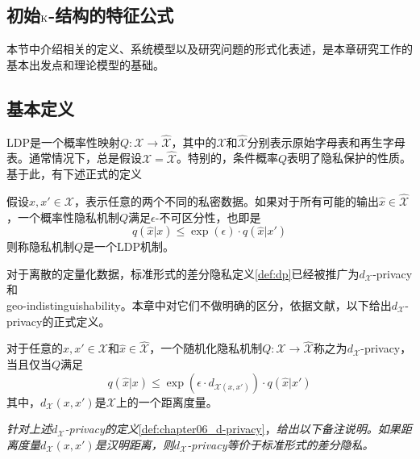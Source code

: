 \subsection{初始$\textsc{k}$-结构的特征公式}

本节中介绍相关的定义、系统模型以及研究问题的形式化表述，是本章研究工作的基本出发点和理论模型的基础。

\subsection{基本定义}\label{sec:chapter06_basic_definitions}

LDP\cite{duchi2013local}是一个概率性映射$Q:\mathcal{X}\rightarrow \hat{\mathcal{X}}$，其中的$\mathcal{X}$和$\hat{\mathcal{X}}$分别表示原始字母表和再生字母表。通常情况下，总是假设$\mathcal{X}=\hat{\mathcal{X}}$。特别的，条件概率$Q$表明了隐私保护的性质。基于此，有下述正式的定义\cite{kasiviswanathan2011what}
\begin{definition}\label{def:chapter06_LDP}
	假设$x,x' \in \mathcal{X}$，表示任意的两个不同的私密数据。如果对于所有可能的输出$\hat{x} \in \hat{\mathcal{X}}$，一个概率性隐私机制$Q$满足$\epsilon$-不可区分性，也即是
	\begin{equation}
		q(\hat{x}|x) \leq \exp(\epsilon)\cdot q(\hat{x}|x')
	\end{equation}
则称隐私机制$Q$是一个LDP机制。
\end{definition}

对于离散的定量化数据，标准形式的差分隐私定义\ref{def:dp}已经被推广为$d_{\mathcal{X}}$-privacy\cite{chatzikokolakis2013broadening}和\\geo-indistinguishability\cite{andres2013geo,bordenabe2014optimal}。本章中对它们不做明确的区分，依据文献，以下给出$d_{\mathcal{X}}$-privacy的正式定义。

\begin{definition}\label{def:chapter06_d-privacy}
	对于任意的$x,x' \in \mathcal{X}$和$\hat{x} \in \hat{\mathcal{X}}$，一个随机化隐私机制$Q:\mathcal{X}\rightarrow \hat{\mathcal{X}}$称之为$d_{\mathcal{X}}$-privacy，当且仅当$Q$满足
	\begin{equation}
	q(\hat{x}|x) \leq \exp(\epsilon \cdot d_{\mathcal{X}(x,x')}) \cdot q(\hat{x}|x')
	\end{equation}
其中，$d_{\mathcal{X}}(x,x')$是$\mathcal{X}$上的一个距离度量。
\end{definition}

\begin{remark}{\em
针对上述$d_{\mathcal{X}}$-privacy的定义}\ref{def:chapter06_d-privacy}，{\em 给出以下备注说明。如果距离度量$d_{\mathcal{X}}(x,x')$是汉明距离，则$d_{\mathcal{X}}$-privacy等价于标准形式的差分隐私。}
\end{remark}

